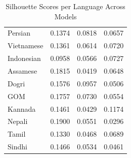 \documentclass[11pt]{article} %
\begin{document}
\begin{table}[htbp]
\begin{tabular}{lccc}
            Persian                    & 0.1374           & 0.0818        & 0.0657               \\
            Vietnamese                 & 0.1361           & 0.0614        & 0.0720               \\
            Indonesian                 & 0.0958           & 0.0566        & 0.0727               \\
            Assamese                   & 0.1815           & 0.0419        & 0.0648               \\
            Dogri                      & 0.1576           & 0.0957        & 0.0506               \\
            GOM                        & 0.1757           & 0.0730        & 0.0554               \\
            Kannada                    & 0.1461           & 0.0429        & 0.1174               \\
            Nepali                     & 0.1900           & 0.0551        & 0.0296               \\
            Tamil                      & 0.1330           & 0.0468        & 0.0689               \\
            Sindhi                     & 0.1466           & 0.0534        & 0.0461               \\
            \bottomrule
        \end{tabular}
        \caption{Silhouette Scores per Language Across Models}
        \label{tab:silhouette_scores}
    \end{table}
\end{document}
